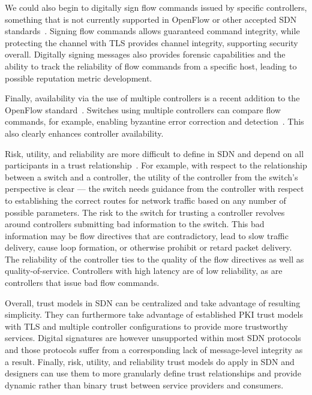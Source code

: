 \documentclass[10pt,conference]{IEEEtran}
\begin{document}
We could also begin to digitally sign flow commands issued by specific controllers, something that is not currently supported in OpenFlow or other accepted SDN standards~\cite{big_network_controller,openflow1.4}.  Signing flow commands allows guaranteed command integrity, while protecting the channel with TLS provides channel integrity, supporting security overall.  Digitally signing messages also provides forensic capabilities and the ability to track the reliability of flow commands from a specific host, leading to possible reputation metric development.

Finally, availability via the use of multiple controllers is a recent addition to the OpenFlow standard~\cite{openflow1.4}.  Switches using multiple controllers can compare flow commands, for example, enabling byzantine error correction and detection~\cite{FeMi:88, TaKaCh:11}.  This also clearly enhances controller availability.

Risk, utility, and reliability are more difficult to define in SDN and depend on all participants in a trust relationship~\cite{JoPr:04}.  For example, with respect to the relationship between a switch and a controller, the utility of the controller from the switch's perspective is clear --- the switch needs guidance from the controller with respect to establishing the correct routes for network traffic based on any number of possible parameters.  The risk to the switch for trusting a controller revolves around controllers submitting bad information to the switch.  This bad information may be flow directives that are contradictory, lead to slow traffic delivery, cause loop formation, or otherwise prohibit or retard packet delivery.  The reliability of the controller ties to the quality of the flow directives as well as quality-of-service.  Controllers with high latency are of low reliability, as are controllers that issue bad flow commands.

Overall, trust models in SDN can be centralized and take advantage of resulting simplicity.  They can furthermore take advantage of established PKI trust models with TLS and multiple controller configurations to provide more trustworthy services.  Digital signatures are however unsupported within most SDN protocols and those protocols suffer from a corresponding lack of message-level integrity as a result.  Finally, risk, utility, and reliability trust models do apply in SDN and designers can use them to more granularly define trust relationships and provide dynamic rather than binary trust between service providers and consumers.
\end{document}
